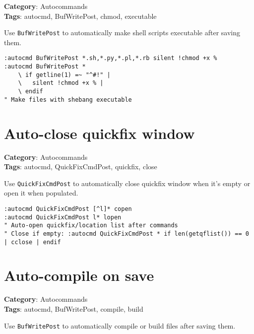 \textbf{Category}: Autocommands\\ \textbf{Tags}: autocmd, BufWritePost, chmod, executable
\vspace{0.5cm}

Use {\footnotesize \Verb§BufWritePost§} to automatically make shell scripts executable after saving them.

\begin{Exa*}{}
\begin{Verbatim}[fontsize=\footnotesize, breaklines, breakanywhere]
:autocmd BufWritePost *.sh,*.py,*.pl,*.rb silent !chmod +x %
:autocmd BufWritePost * 
    \ if getline(1) =~ "^#!" | 
    \   silent !chmod +x % | 
    \ endif
" Make files with shebang executable
\end{Verbatim}
\end{Exa*}

\section{Auto-close quickfix window}

\textbf{Category}: Autocommands\\ \textbf{Tags}: autocmd, QuickFixCmdPost, quickfix, close
\vspace{0.5cm}

Use {\footnotesize \Verb§QuickFixCmdPost§} to automatically close quickfix window when it's empty or open it when populated.

\begin{Exa*}{}
\begin{Verbatim}[fontsize=\footnotesize, breaklines, breakanywhere]
:autocmd QuickFixCmdPost [^l]* copen
:autocmd QuickFixCmdPost l* lopen
" Auto-open quickfix/location list after commands
" Close if empty: :autocmd QuickFixCmdPost * if len(getqflist()) == 0 | cclose | endif
\end{Verbatim}
\end{Exa*}

\section{Auto-compile on save}

\textbf{Category}: Autocommands\\ \textbf{Tags}: autocmd, BufWritePost, compile, build
\vspace{0.5cm}

Use {\footnotesize \Verb§BufWritePost§} to automatically compile or build files after saving them.

